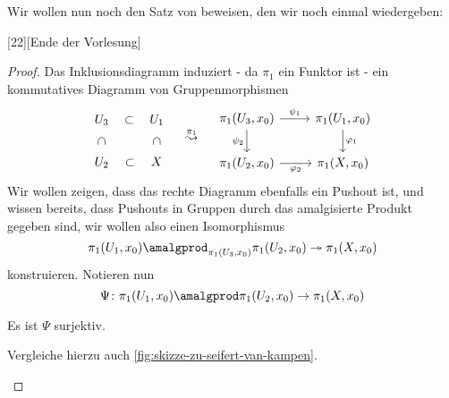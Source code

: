 Wir wollen nun noch den Satz von  beweisen, den wir noch einmal wiedergeben:

[22]{}[Ende der Vorlesung]


\begin{proof}
    Das Inklusionsdiagramm induziert - da $\pi_1$ ein Funktor ist - ein kommutatives Diagramm von Gruppenmorphismen
    \[
        \begin{tikzcd}[anchor=center]
        U_3 \ar[swap, phantom]{d}[rotate=-90]{\subset } \ar[phantom]{r}{\subset } & U_1 \ar[phantom]{d}[rotate=-90]{\subset } \\
        U_2 \ar[swap, phantom]{r}{\subset } & X
    \end{tikzcd}
    \quad \stackrel{\pi_1}{\leadsto} \quad
    \begin{tikzcd}[anchor=center]
        \pi_1( U_3 ,x_0)\ar[swap]{d}{\psi _2} \ar{r}{\psi _1} &\pi_1( U_1,x_0) \ar{d}{\varphi_1} \\
        \pi_1(U_2,x_0) \ar[swap]{r}{\varphi_2} & \pi_1(X,x_0)
    \end{tikzcd}
    \]
Wir wollen zeigen, dass das rechte Diagramm ebenfalls ein Pushout ist, und wissen bereits, dass Pushouts in Gruppen durch das amalgisierte Produkt gegeben sind, wir wollen also einen Isomorphismus
\[
    \pi_1(U_1,x_0) \amalgprod_{\pi_1(U_3,x_0)} \pi_1(U_2,x_0) \twoheadrightarrow \pi_1(X,x_0)
\] 
konstruieren. Notieren nun 
\[
    \Psi \colon \pi_1(U_1,x_0) \amalgprod \pi_1(U_2,x_0) \to \pi_1(X,x_0)
\] 


\begin{claim}
    Es ist $\Psi$ surjektiv.
\end{claim}
\begin{subproof}
    Vergleiche hierzu auch \autoref{fig:skizze-zu-seifert-van-kampen}.
    

\end{subproof}
\end{proof}
